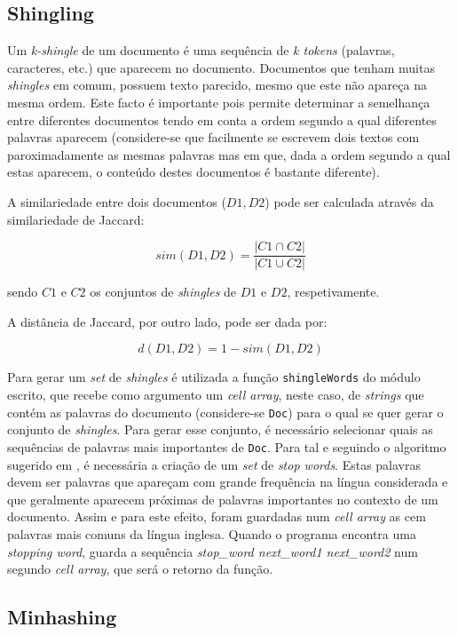 \documentclass[a4paper,11pt,openright,oneside]{report}
\begin{document}
\subsection{Shingling}
\label{subsec.shingling}

Um \textit{k-shingle} de um documento é uma sequência de \textit{k tokens} (palavras, caracteres, etc.) que aparecem no documento. Documentos que tenham muitas \textit{shingles} em comum, possuem texto parecido, mesmo que este não apareça na mesma ordem. Este facto é importante pois permite determinar a semelhança entre diferentes documentos tendo em conta a ordem segundo a qual diferentes palavras aparecem (considere-se que facilmente se escrevem dois textos com paroximadamente as mesmas palavras mas em que, dada a ordem segundo a qual estas aparecem, o conteúdo destes documentos é bastante diferente).

A similariedade entre dois documentos ($D1, D2$) pode ser calculada através da similariedade de Jaccard:

$$ sim(D1, D2) = \frac{|C1\cap C2|}{|C1\cup C2|} $$

sendo $C1$ e $C2$ os conjuntos de \textit{shingles} de $D1$ e $D2$, respetivamente.

A distância de Jaccard, por outro lado, pode ser dada por:

$$ d(D1, D2) = 1 - sim(D1, D2) $$

Para gerar um \textit{set} de \textit{shingles} é utilizada a função \texttt{shingleWords} do módulo escrito, que recebe como argumento um \textit{cell array}, neste caso, de \textit{strings} que contém as palavras do documento (considere-se \texttt{Doc}) para o qual se quer gerar o conjunto de \textit{shingles}. Para gerar esse conjunto, é necessário selecionar quais as sequências de palavras mais importantes de \texttt{Doc}. Para tal e seguindo o algoritmo sugerido em \cite{book1}, é necessária a criação de um \textit{set} de \textit{stop words}. Estas palavras devem ser palavras que apareçam com grande frequência na língua considerada e que geralmente aparecem próximas de palavras importantes no contexto de um documento. Assim e para este efeito, foram guardadas num \textit{cell array} as cem palavras mais comuns da língua inglesa. Quando o programa encontra uma \textit{stopping word}, guarda a sequência \textit{stop\_word next\_word1 next\_word2} num segundo \textit{cell array}, que será o retorno da função.

\subsection{Minhashing}
\label{subsec.minhash}
\end{document}
